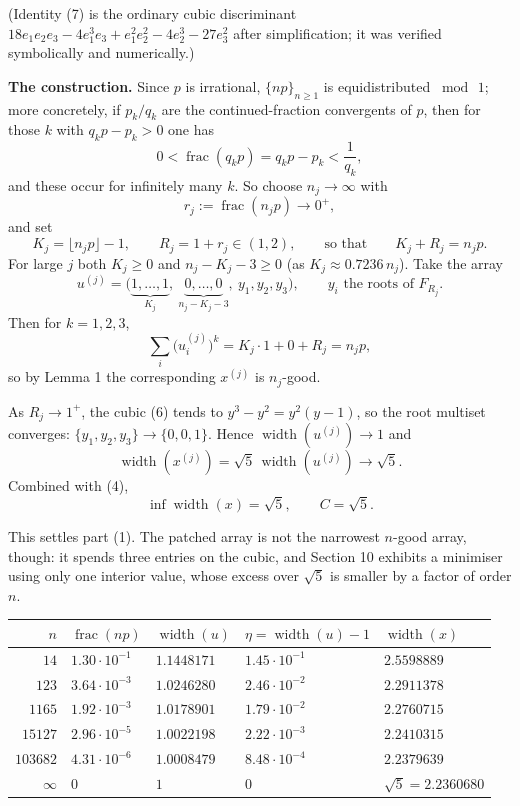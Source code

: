 \documentclass[12pt]{article}
\newcommand{\W}{\operatorname{width}}
\newcommand{\fr}{\operatorname{frac}}
\begin{document}
(Identity (7) is the ordinary cubic discriminant
\(18e_1e_2e_3-4e_1^3e_3+e_1^2e_2^2-4e_2^3-27e_3^2\) after simplification;
it was verified symbolically and numerically.)

\textbf{The construction.} Since \(p\) is irrational, \(\{np\}_{n\ge1}\)
is equidistributed \(\bmod\,1\); more concretely, if \(p_k/q_k\) are the
continued-fraction convergents of \(p\), then for those \(k\) with
\(q_kp-p_k>0\) one has
\[
0<\fr(q_kp)=q_kp-p_k<\frac1{q_k},
\]
and these occur for infinitely many \(k\). So choose \(n_j\to\infty\)
with
\[
r_j:=\fr(n_jp)\longrightarrow0^+ ,
\]
and set
\[
K_j=\lfloor n_jp\rfloor-1,\qquad R_j=1+r_j\in(1,2),
\qquad\text{so that}\qquad K_j+R_j=n_jp .
\tag{8}
\]
For large \(j\) both \(K_j\ge0\) and \(n_j-K_j-3\ge0\) (as
\(K_j\approx0.7236\,n_j\)). Take the array
\[
u^{(j)}=\bigl(\underbrace{1,\dots,1}_{K_j},\
\underbrace{0,\dots,0}_{n_j-K_j-3},\ y_1,y_2,y_3\bigr),
\qquad y_i \text{ the roots of }F_{R_j}.
\]
Then for \(k=1,2,3\),
\[
\sum_i \bigl(u^{(j)}_i\bigr)^k=K_j\cdot1+0+R_j=n_jp,
\]
so by Lemma 1 the corresponding \(x^{(j)}\) is \(n_j\)-good.

As \(R_j\to1^+\), the cubic (6) tends to \(y^3-y^2=y^2(y-1)\), so the root
multiset converges: \(\{y_1,y_2,y_3\}\to\{0,0,1\}\). Hence
\(\W(u^{(j)})\to1\) and
\[
\W(x^{(j)})=\sqrt5\,\W(u^{(j)})\longrightarrow\sqrt5 .
\]
Combined with (4),
\[
\boxed{\displaystyle
\inf\W(x)=\sqrt5,
\qquad
C=\sqrt5 . }
\]

This settles part (1). The patched array is not the narrowest \(n\)-good
array, though: it spends three entries on the cubic, and Section 10
exhibits a minimiser using only one interior value, whose excess over
\(\sqrt5\) is smaller by a factor of order \(n\).

\begin{center}
\small
\renewcommand{\arraystretch}{1.35}
\begin{tabularx}{0.98\textwidth}{@{}rXXXX@{}}
\toprule
\(n\) & \(\fr(np)\) & \(\W(u)\) & \(\eta=\W(u)-1\) & \(\W(x)\) \\
\midrule
\(14\)      & \(1.30\cdot10^{-1}\) & \(1.1448171\) & \(1.45\cdot10^{-1}\) & \(2.5598889\) \\
\(123\)     & \(3.64\cdot10^{-3}\) & \(1.0246280\) & \(2.46\cdot10^{-2}\) & \(2.2911378\) \\
\(1165\)    & \(1.92\cdot10^{-3}\) & \(1.0178901\) & \(1.79\cdot10^{-2}\) & \(2.2760715\) \\
\(15127\)   & \(2.96\cdot10^{-5}\) & \(1.0022198\) & \(2.22\cdot10^{-3}\) & \(2.2410315\) \\
\(103682\)  & \(4.31\cdot10^{-6}\) & \(1.0008479\) & \(8.48\cdot10^{-4}\) & \(2.2379639\) \\
\midrule
\(\infty\) & \(0\) & \(1\) & \(0\) & \(\sqrt5=2.2360680\) \\
\bottomrule
\end{tabularx}
\end{center}
\end{document}
